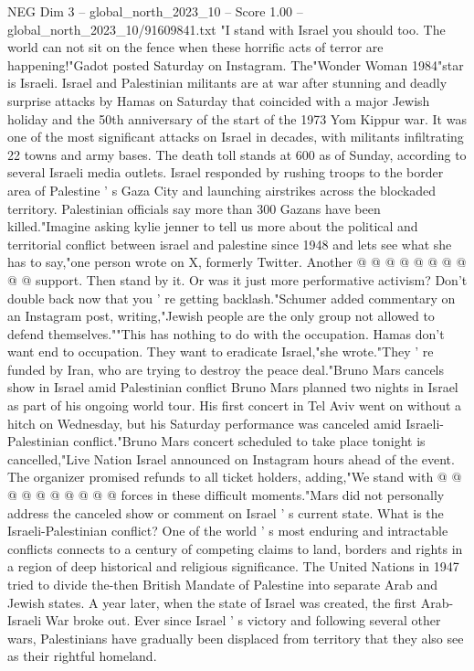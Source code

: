\begin{textsample}{NEG Dim 3 – global\_north\_2023\_10 – Score 1.00 – global\_north\_2023\_10/91609841.txt}  \label{ex:f3_neg_190}
"I stand with Israel you should too.
The world can not sit on the fence when these horrific acts of terror are happening!"Gadot posted Saturday on Instagram.
The"Wonder Woman 1984"star is Israeli.
Israel and Palestinian militants are at war after stunning and deadly surprise attacks by Hamas on Saturday that coincided with a major Jewish holiday and the 50th anniversary of the start of the 1973 Yom Kippur war.
It was one of the most significant attacks on Israel in decades, with militants infiltrating 22 towns and army bases.
The death toll stands at 600 as of Sunday, according to several Israeli media outlets.
Israel responded by rushing troops to the border area of Palestine ' s Gaza City and launching airstrikes across the blockaded territory.
Palestinian officials say more than 300 Gazans have been killed."Imagine asking kylie jenner to tell us more about the political and territorial conflict between israel and palestine since 1948 and lets see what she has to say,"one person wrote on X, formerly Twitter.
Another @ @ @ @ @ @ @ @ @ @ support.
Then stand by it.
Or was it just more performative activism?
Don't double back now that you ' re getting backlash."Schumer added commentary on an Instagram post, writing,"Jewish people are the only group not allowed to defend themselves.""This has nothing to do with the occupation.
Hamas don't want end to occupation.
They want to eradicate Israel,"she wrote."They ' re funded by Iran, who are trying to destroy the peace deal."Bruno Mars cancels show in Israel amid Palestinian conflict Bruno Mars planned two nights in Israel as part of his ongoing world tour.
His first concert in Tel Aviv went on without a hitch on Wednesday, but his Saturday performance was canceled amid Israeli-Palestinian conflict."Bruno Mars concert scheduled to take place tonight is cancelled,"Live Nation Israel announced on Instagram hours ahead of the event.
The organizer promised refunds to all ticket holders, adding,"We stand with @ @ @ @ @ @ @ @ @ @ forces in these difficult moments."Mars did not personally address the canceled show or comment on Israel ' s current state.
What is the Israeli-Palestinian conflict?
One of the world ' s most enduring and intractable conflicts connects to a century of competing claims to land, borders and rights in a region of deep historical and religious significance.
The United Nations in 1947 tried to divide the-then British Mandate of Palestine into separate Arab and Jewish states.
A year later, when the state of Israel was created, the first Arab-Israeli War broke out.
Ever since Israel ' s victory and following several other wars, Palestinians have gradually been displaced from territory that they also see as their rightful homeland.

\end{textsample}
